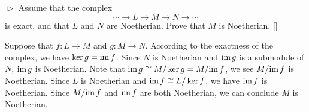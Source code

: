 \documentclass[12pt,letterpaper,boxed]{hmcpset}
\newcommand{\im}{\mathrm{im}\hspace{1.5pt}}
\begin{document}
\begin{problem}[7.5]
$\vartriangleright$ Assume that the complex
\[
\cdots \longrightarrow L \longrightarrow M\longrightarrow N \rightarrow\cdots
\]
is exact, and that $L$ and $N$ are Noetherian. Prove that $M$ is Noetherian. []
\end{problem}
\begin{solution}
Suppose that $f:L\to M$ and $g:M\to N$. According to the exactness of the complex, we have $\ker g=\im f$. Since $N$ is Noetherian and $\im g$ is a submodule of $N$, $\im g$ is Noetherian. Note that $\im g\cong M/\ker g=M/\im f$, we see $M/\im f$ is Noetherian. Since $L$ is Noetherian and $\im f\cong L/\ker f$, we have $\im f$ is Noetherian. Since $M/\im f$ and $\im f$ are both Noetherian, we can conclude $M$ is Noetherian.
\end{solution}
\end{document}
